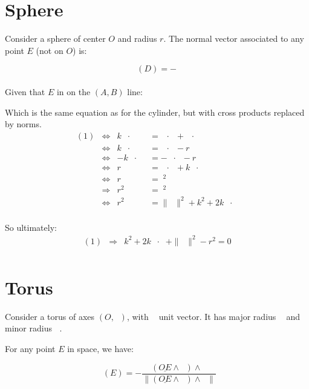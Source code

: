 \documentclass[10pt,a4paper]{article}
\newcommand{\ud}[1]{\underline{#1}}
\DeclareMathOperator{\cross}{\wedge}
\DeclareMathOperator{\AO}{\ud{AO}}
\DeclareMathOperator{\OA}{\ud{OA}}
\DeclareMathOperator{\OD}{\ud{OD}}
\DeclareMathOperator{\eA}{\ud{e}_A}
\DeclareMathOperator{\n}{\ud{n}}
\DeclareMathOperator{\z}{\ud{z}}
\DeclareMathOperator{\ODn}{\|\ud{OD}\|}
\DeclareMathOperator{\ra}{r_{a}}
\DeclareMathOperator{\ea}{\ud{e}_{a}}
\DeclareMathOperator{\rb}{r_{b}}
\begin{document}
\section{Sphere}

Consider a sphere of center $O$ and radius $r$.
The normal vector associated to any point $E$ (not on $O$) is:

$$
\n(D) = - \frac{\OD}{\ODn}
$$

Given that $E$ in on the $(A, B)$ line:

Which is the same equation as for the cylinder, but with cross products
replaced by norms.
$$
\begin{array}{llll}
    (1)
    
    & \Leftrightarrow &
    k\eA\cdot\n
    & = \AO\cdot\n + \OD\cdot \n\\
    
    & \Leftrightarrow &
    k\eA\cdot\n
    & = \AO\cdot\n - r\\
    
    & \Leftrightarrow &
    -k\eA\cdot\OD
    & = -\AO\cdot\OD - r\ODn\\
    
    & \Leftrightarrow &
    r\ODn
    & = \OA\cdot\OD + k\eA\cdot\OD\\
    
    & \Leftrightarrow &
    r\ODn
    & = \ODn^2\\

    & \Rightarrow &
    r^2
    & = \ODn^2\\

    & \Leftrightarrow &
    r^2
    & = \|\OA\|^2 + k^2 + 2k\OA\cdot\eA\\
\end{array}
$$

So ultimately:
$$
\begin{array}{llll}
    (1)
    & \Rightarrow &
    k^2 + 2k\OA\cdot\eA + \|\OA\|^2 - r^2 = 0\\
\end{array}
$$


\newpage
\section{Torus}

Consider a torus of axes $(O, \z)$, with $\z$  unit vector.
It has major radius $\ra$ and minor radius $\rb$.

For any point $E$ in space, we have:

$$
    \ea(E) = - \frac{(\ud{OE} \cross  \z) \cross \z}{
    \|(\ud{OE} \cross  \z) \cross \z\|
}
$$
\end{document}
